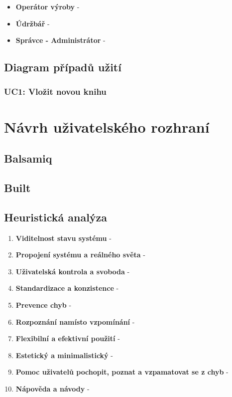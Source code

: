 \documentclass[thesis=M,czech]{FITthesis}[2012/06/26]
\begin{document}
\begin{itemize}
	\item
	\textbf{Operátor výroby} - 
	\item
	\textbf{Údržbář} - 
	\item
	\textbf{Správce - Administrátor} - 
\end{itemize} 	

\subsection{Diagram případů užití}

\subsubsection{UC1: Vložit novou knihu}

\section{Návrh uživatelského rozhraní}

\subsection{Balsamiq}

\subsection{Built}

\subsection{Heuristická analýza}

\begin{enumerate}
	\item
	\textbf{Viditelnost stavu systému} -
	\item
	\textbf{Propojení systému a reálného světa} -
	\item
	\textbf{Uživatelská kontrola a svoboda} -
	\item
	\textbf{Standardizace a konzistence} -
	\item
	\textbf{Prevence chyb} -
	\item
	\textbf{Rozpoznání namísto vzpomínání} -
	\item
	\textbf{Flexibilní a efektivní použití} -
	\item
	\textbf{Estetický a minimalistický} -
	\item
	\textbf{Pomoc uživatelů pochopit, poznat a vzpamatovat se z chyb} -
	\item
	\textbf{Nápověda a návody} -
\end{enumerate} 
\end{document}
